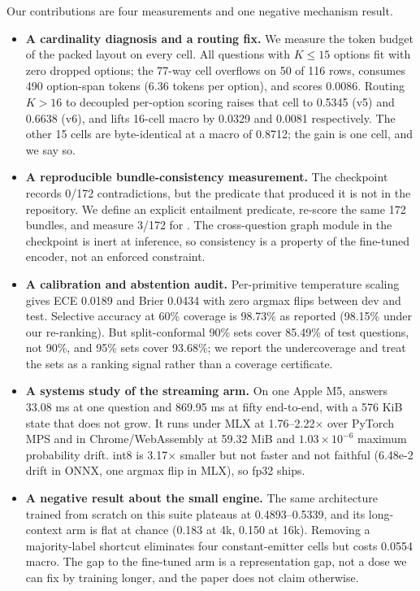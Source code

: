 Our contributions are four measurements and one negative mechanism result.
\begin{itemize}
\item \textbf{A cardinality diagnosis and a routing fix.} We measure the token budget of the packed layout on every cell. All questions with $K\le15$ options fit with zero dropped options; the 77-way cell overflows on 50 of 116 rows, consumes 490 option-span tokens (6.36 tokens per option), and scores 0.0086. Routing $K>16$ to decoupled per-option scoring raises that cell to 0.5345 (v5) and 0.6638 (v6), and lifts 16-cell macro by 0.0329 and 0.0081 respectively. The other 15 cells are byte-identical at a macro of 0.8712; the gain is one cell, and we say so.
\item \textbf{A reproducible bundle-consistency measurement.} The checkpoint records 0/172 contradictions, but the predicate that produced it is not in the repository. We define an explicit entailment predicate, re-score the same 172 bundles, and measure 3/172 for \vsix{}. The cross-question graph module in the checkpoint is inert at inference, so consistency is a property of the fine-tuned encoder, not an enforced constraint.
\item \textbf{A calibration and abstention audit.} Per-primitive temperature scaling gives ECE 0.0189 and Brier 0.0434 with zero argmax flips between dev and test. Selective accuracy at 60\% coverage is 98.73\% as reported (98.15\% under our re-ranking). But split-conformal 90\% sets cover 85.49\% of test questions, not 90\%, and 95\% sets cover 93.68\%; we report the undercoverage and treat the sets as a ranking signal rather than a coverage certificate.
\item \textbf{A systems study of the streaming arm.} On one Apple M5, \stream{} answers 33.08 ms at one question and 869.95 ms at fifty end-to-end, with a 576 KiB state that does not grow. It runs under MLX at 1.76--2.22$\times$ over PyTorch MPS and in Chrome/WebAssembly at 59.32 MiB and $1.03\times10^{-6}$ maximum probability drift. int8 is 3.17$\times$ smaller but not faster and not faithful (6.48e-2 drift in ONNX, one argmax flip in MLX), so fp32 ships.
\item \textbf{A negative result about the small engine.} The same architecture trained from scratch on this suite plateaus at 0.4893--0.5339, and its long-context arm is flat at chance (0.183 at 4k, 0.150 at 16k). Removing a majority-label shortcut eliminates four constant-emitter cells but costs 0.0554 macro. The gap to the fine-tuned arm is a representation gap, not a dose we can fix by training longer, and the paper does not claim otherwise.
\end{itemize}

